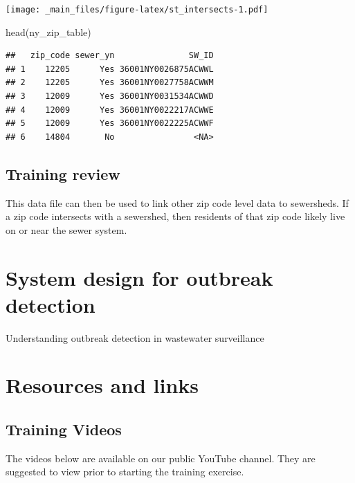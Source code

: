 \documentclass[
]{book}
\newenvironment{Shaded}{\begin{snugshade}}{\end{snugshade}}
\newcommand{\FunctionTok}[1]{\textcolor[rgb]{0.00,0.00,0.00}{#1}}
\newcommand{\NormalTok}[1]{#1}
\begin{document}
\texttt{[image: \_main\_files/figure-latex/st\_intersects-1.pdf]}

\begin{Shaded}
\begin{Highlighting}[]
\FunctionTok{head}\NormalTok{(ny\_zip\_table)}
\end{Highlighting}
\end{Shaded}

\begin{verbatim}
##   zip_code sewer_yn               SW_ID
## 1    12205      Yes 36001NY0026875ACWWL
## 2    12205      Yes 36001NY0027758ACWWM
## 3    12009      Yes 36001NY0031534ACWWD
## 4    12009      Yes 36001NY0022217ACWWE
## 5    12009      Yes 36001NY0022225ACWWF
## 6    14804       No                <NA>
\end{verbatim}

\hypertarget{training-review-2}{%
\section{Training review}\label{training-review-2}}

This data file can then be used to link other zip code level data to sewersheds. If a zip code intersects with a sewershed, then residents of that zip code likely live on or near the sewer system.

\hypertarget{system-design-for-outbreak-detection}{%
\chapter{System design for outbreak detection}\label{system-design-for-outbreak-detection}}

Understanding outbreak detection in wastewater surveillance

\hypertarget{resources-and-links}{%
\chapter{Resources and links}\label{resources-and-links}}

\hypertarget{training-videos}{%
\section{Training Videos}\label{training-videos}}

The videos below are available on our public YouTube channel. They are suggested to view prior to starting the training exercise.
\end{document}

